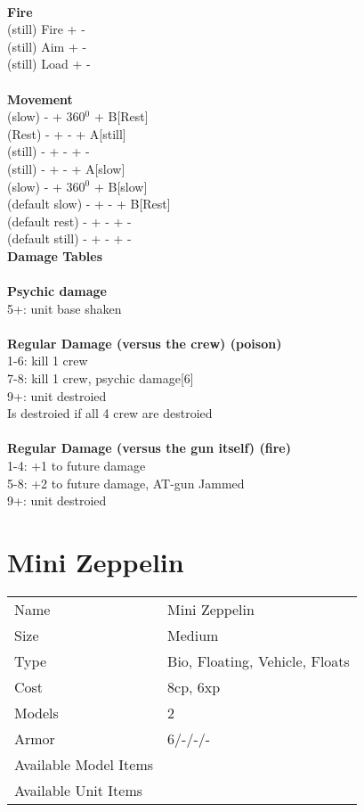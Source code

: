 \ \\ {\bf Fire } \\
(still) Fire + - \\
(still) Aim + - \\
(still) Load + - \\
\ \\ {\bf Movement } \\
(slow) - + 360$^0$ + B[Rest] \\
(Rest) - + - + A[still] \\
(still) - + - + - \\
(still) - + - + A[slow] \\
(slow) - + 360$^0$ + B[slow] \\
(default slow) - + - + B[Rest] \\
(default rest) - + - + - \\
(default still) - + - + - \\



{\bf Damage Tables} \\
\ \\ {\bf Psychic damage } \\
5+: unit base shaken \\
\ \\ {\bf Regular Damage (versus the crew) (poison) } \\
1-6: kill 1 crew \\
7-8: kill 1 crew, psychic damage[6] \\
9+: unit destroied  \\
Is destroied if all 4 crew are destroied \\
\ \\ {\bf Regular Damage (versus the gun itself) (fire) } \\
1-4: +1 to future damage \\
5-8: +2 to future damage, AT-gun Jammed \\
9+: unit destroied  \\









\pagebreak

\section{ Mini Zeppelin }

\begin{tabular}{ll}
  Name & Mini Zeppelin \\
  Size & Medium\\
  Type & Bio, Floating, Vehicle, Floats\\
  Cost & 8cp, 6xp\\
  Models & 2\\
  Armor & 6/-/-/-\\
  Available Model Items &  \\
  Available Unit Items &  \\
\end{tabular}

